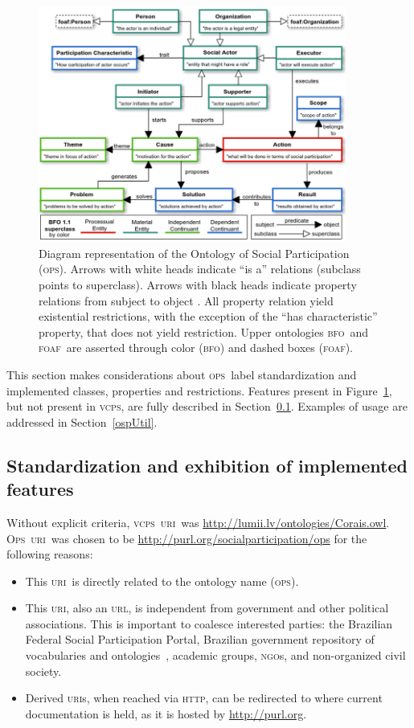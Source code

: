 \documentclass[10pt,letterpaper]{article}
\newcommand{\ops}{\textsc{ops}}
\newcommand{\opsi}{O\textsc{ps}}
\newcommand{\vcps}{\textsc{vcps}}
\newcommand{\bfo}{\textsc{bfo}}
\newcommand{\foaf}{\textsc{foaf}}
\newcommand{\uri}{\textsc{uri}}
\newcommand{\urll}{\textsc{url}}
\newcommand{\ngo}{\textsc{ngo}}
\newcommand{\http}{\textsc{http}}
\begin{document}
\begin{figure}
    \centering
    \includegraphics[width=0.9\textwidth]{figs/opsBFO___}
    \caption{Diagram representation of the Ontology of Social Participation (\ops). Arrows with white heads indicate ``is a'' relations (subclass points to superclass). Arrows with black heads indicate property relations from subject to object . All property relation yield existential restrictions, with the exception of the ``has characteristic'' property, that does not yield restriction. Upper ontologies \bfo\ and \foaf\ are asserted through color (\bfo) and dashed boxes (\foaf).}
    \label{fig:v1}
\end{figure}

This section makes considerations about \ops\ label standardization and implemented classes, properties and restrictions. Features present in Figure~\ref{fig:v1}, but not present in \vcps, are fully described in Section~\ref{impl}. Examples of usage are addressed in Section~\ref{ospUtil}. 


\subsection{Standardization and exhibition of implemented features}\label{impl}
Without explicit criteria, \vcps\ \uri\ was \url{http://lumii.lv/ontologies/Corais.owl}. \opsi\ \uri\ was chosen to be \url{http://purl.org/socialparticipation/ops} for the following reasons:
\begin{itemize}
    \item This \uri\ is directly related to the ontology name (\ops).
    \item This \uri, also an \urll, is independent from government and other political associations. This is important to coalesce interested parties: the Brazilian Federal Social Participation Portal\cite{participa}, Brazilian government repository of vocabularies and ontologies~\cite{vocab}, academic groups,  \ngo s, and non-organized civil society.
    \item Derived \uri s, when reached via \http, can be redirected to where current documentation is held, as it is hosted by \url{http://purl.org}.
\end{itemize}
\end{document}
